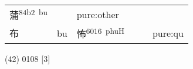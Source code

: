 \documentclass[14pt,a4paper]{scrartcl}
\begin{document}
\begin{longtable}[c]{@{}llllll@{}}
\begin{minipage}[t]{0.14\columnwidth}
蒲\textsuperscript{84b2~bu}
\strut\end{minipage} &
\begin{minipage}[t]{0.14\columnwidth}\raggedright\strut
\strut\end{minipage} &
\begin{minipage}[t]{0.14\columnwidth}\raggedright\strut
pure:other
\strut\end{minipage}\tabularnewline
\begin{minipage}[t]{0.14\columnwidth}\raggedright\strut
布
\strut\end{minipage} &
\begin{minipage}[t]{0.14\columnwidth}\raggedright\strut
bu
\strut\end{minipage} &
\begin{minipage}[t]{0.14\columnwidth}\raggedright\strut
怖\textsuperscript{6016~phuH}
\strut\end{minipage} &
\begin{minipage}[t]{0.14\columnwidth}\raggedright\strut
\strut\end{minipage} &
\begin{minipage}[t]{0.14\columnwidth}\raggedright\strut
\strut\end{minipage} &
\begin{minipage}[t]{0.14\columnwidth}\raggedright\strut
pure:qu
\strut\end{minipage}\tabularnewline
\bottomrule
\end{longtable}

(42) 0108 {[}3{]}
\end{document}
